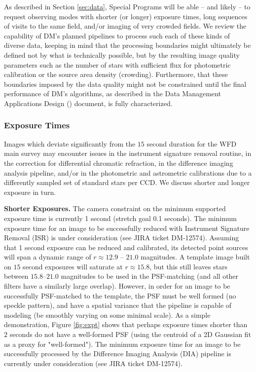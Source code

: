 \documentclass[DM,lsstdoc,toc]{lsstdoc}
\begin{document}
As described in Section \ref{sec:data}, Special Programs will be able -- and likely -- to request observing modes with shorter (or longer) exposure times, long sequences of visits to the same field, and/or imaging of very crowded fields. We review the capability of DM's planned pipelines to process such each of these kinds of diverse data, keeping in mind that the processing boundaries might ultimately be defined not by what is technically possible, but by the resulting image quality parameters such as the number of stars with sufficient flux for photometric calibration or the source area density (crowding). Furthermore, that these boundaries imposed by the data quality might not be constrained until the final performance of DM's algorithms, as described in the Data Management Applications Design () document, is fully characterized.

\subsubsection{Exposure Times}\label{sssec:dmplans_NSV_expt}

Images which deviate significantly from the $15$ second duration for the WFD main survey may encounter issues in the instrument signature removal routine, in the correction for differential chromatic refraction, in the difference imaging analysis pipeline, and/or in the photometric and astrometric calibrations due to a differently sampled set of standard stars per CCD. We discuss shorter and longer exposure in turn.

\textbf{Shorter Exposures.} The camera constraint on the minimum supported exposure time is currently 1 second (stretch goal 0.1 seconds). The minimum exposure time for an image to be successfully reduced with Instrument Signature Removal (ISR) is under consideration (see JIRA ticket DM-12574). Assuming that 1 second exposure can be reduced and calibrated, its detected point sources will span a dynamic range of $r \approx 12.9$ -- $21.0$ magnitudes. A template image built on $15$ second exposures will saturate at $r \approx 15.8$, but this still leaves stars between $15.8$--$21.0$ magnitudes to be used in the PSF-matching (and all other filters have a similarly large overlap). However, in order for an image to be successfully PSF-matched to the template, the PSF must be well formed (no speckle pattern), and have a spatial variance that the pipeline is capable of modeling (be smoothly varying on some minimal scale). As a simple demonstration, Figure \ref{fig:expt} shows that perhaps exposure times shorter than $2$ seconds do not have a well-formed PSF (using the centroid of a 2D Gaussian fit as a proxy for "well-formed"). The minimum exposure time for an image to be successfully processed by the Difference Imaging Analysis (DIA) pipeline is currently under consideration (see JIRA ticket DM-12574).
\end{document}
